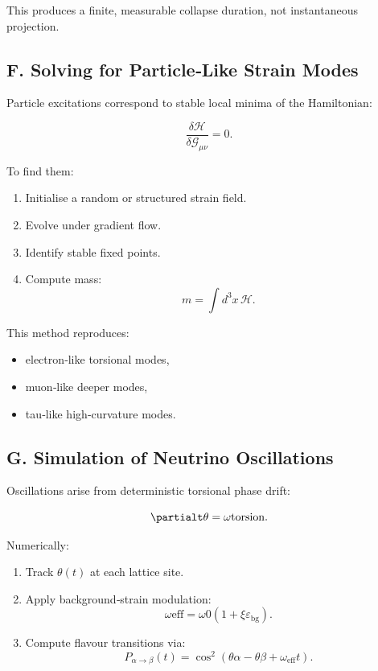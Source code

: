 \documentclass[reprint,amsmath,amssymb,aps,prl,floatfix]{revtex4-2}
\begin{document}
\begin{itemize}
This produces a finite, measurable collapse duration, not instantaneous projection.

\subsection{F. Solving for Particle‑Like Strain Modes}

Particle excitations correspond to stable local minima of the Hamiltonian:

\[
\frac{\delta \mathcal{H}}{\delta \mathcal{G}_{\mu\nu}} = 0.
\]

To find them:

\begin{enumerate}
\item Initialise a random or structured strain field.  
\item Evolve under gradient flow.  
\item Identify stable fixed points.  
\item Compute mass:  
   \[
   m = \int d^3x\,\mathcal{H}.
   \]
\end{enumerate}
\medskip

This method reproduces:
\begin{itemize}
\item electron‑like torsional modes,  
\item muon‑like deeper modes,  
\item tau‑like high‑curvature modes.
\end{itemize}

\subsection{G. Simulation of Neutrino Oscillations}

Oscillations arise from deterministic torsional phase drift:

\[
\partialt \theta = \omega{\mathrm{torsion}}.
\]

Numerically:

\begin{enumerate}
\item Track \(\theta(t)\) at each lattice site.  
\item Apply background‑strain modulation:  
   \[
   \omega{\mathrm{eff}} = \omega0 (1 + \xi \varepsilon_{\mathrm{bg}}).
   \]  
\item Compute flavour transitions via:  
   \[
   P_{\alpha\rightarrow\beta}(t)
   =
   \cos^2(\theta\alpha - \theta\beta + \omega_{\mathrm{eff}} t).
   \]
\end{enumerate}
\medskip


\end{itemize}
\end{document}
